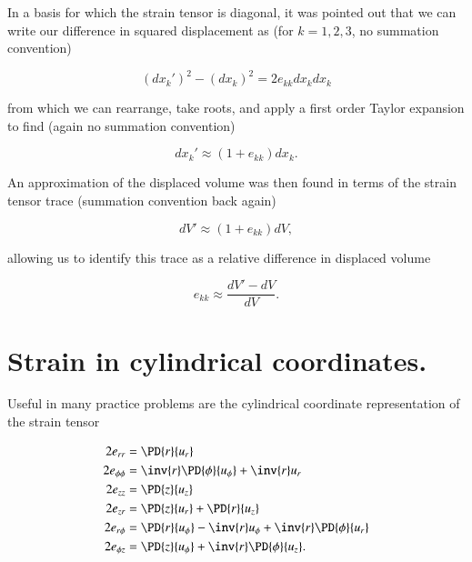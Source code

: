 In a basis for which the strain tensor is diagonal, it was pointed out that we can write our difference in squared displacement as (for $k = 1, 2, 3$, no summation convention)

\begin{equation}\label{eqn:continuumElasticityReview:130}
(dx_k')^2 - (dx_k)^2 = 2 e_{kk} dx_k dx_k
\end{equation}

from which we can rearrange, take roots, and apply a first order Taylor expansion to find (again no summation convention)

\begin{equation}\label{eqn:continuumElasticityReview:150}
dx_k' \approx (1 + e_{kk}) dx_k.
\end{equation}

An approximation of the displaced volume was then found in terms of the strain tensor trace (summation convention back again)

\begin{equation}\label{eqn:continuumElasticityReview:170}
dV' \approx (1 + e_{kk}) dV,
\end{equation}

allowing us to identify this trace as a relative difference in displaced volume

\begin{equation}\label{eqn:continuumElasticityReview:190}
e_{kk} \approx \frac{dV' - dV}{dV}.
\end{equation}

\section{Strain in cylindrical coordinates.}

Useful in many practice problems are the cylindrical coordinate representation of the strain tensor 

\begin{align}\label{eqn:continuumElasticityReview:210}
2 e_{rr} &= \PD{r}{u_r}  \\
2 e_{\phi\phi} &= \inv{r} \PD{\phi}{u_\phi} +\inv{r} u_r  \\
2 e_{zz} &= \PD{z}{u_z}  \\
2 e_{zr} &= \PD{z}{u_r} + \PD{r}{u_z} \\
2 e_{r\phi} &= \PD{r}{u_\phi} - \inv{r} u_\phi + \inv{r} \PD{\phi}{u_r} \\
2 e_{\phi z} &= \PD{z}{u_\phi} +\inv{r} \PD{\phi}{u_z}.
\end{align}

